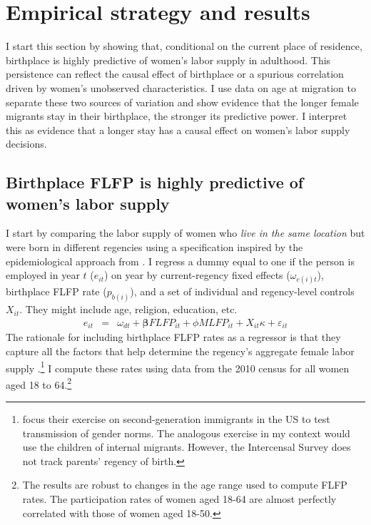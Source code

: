 \section{Empirical strategy and results}
\label{sec:empirical_strategy}
I start this section by showing that, conditional on the current place of residence, birthplace is highly predictive of women's labor supply in adulthood. This persistence can reflect the causal effect of birthplace or a spurious correlation driven by women's unobserved characteristics. I use data on age at migration to separate these two sources of variation and show evidence that the longer female migrants stay in their birthplace, the stronger its predictive power. I interpret this as evidence that a longer stay has a causal effect on women's labor supply decisions.


\subsection{Birthplace FLFP is highly predictive of women's labor supply}	
\label{sec:explanation}
I start by comparing the labor supply of women who \textit{live in the same location} but were born in different regencies using a specification inspired by the epidemiological approach from \cite{Fernandez2009}. I regress a dummy equal to one if the person is employed in year $t$ ($ e_{it}$) on year by current-regency fixed effects  ($\omega_{c(i)t}$), birthplace FLFP rate ($p_{b(i)}$), and a set of individual and regency-level controls $X_{it}$. They might include age, religion, education, etc.
\begin{eqnarray}
	\label{eq:childhood_main}
	e_{it}&=&\omega_{dt}+\boldsymbol \beta FLFP_{it}+\phi MLFP_{it}+X_{it}\kappa+\varepsilon_{it}
\end{eqnarray}
The rationale for including birthplace FLFP rates as a regressor is that they capture all the factors that help determine the regency's aggregate female labor supply \citep{Fernandez2009}.\footnote{\cite{Fernandez2009} focus their exercise on second-generation immigrants in the US to test transmission of gender norms. The analogous exercise in my context would use the children of internal migrants. However, the Intercensal Survey does not track parents' regency of birth.} I compute these rates using data from the 2010 census for all women aged 18 to 64.\footnote{The results are robust to changes in the age range used to compute FLFP rates. The participation rates of women aged 18-64 are almost perfectly correlated with those of women aged 18-50.}

